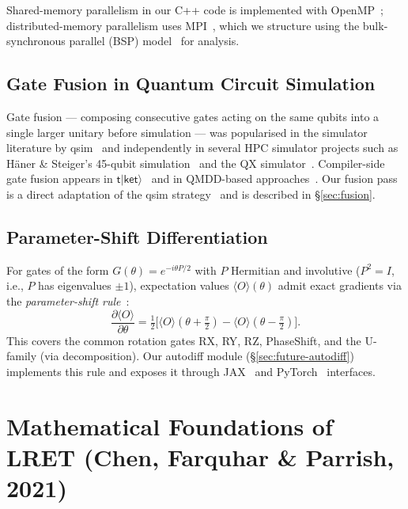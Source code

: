 \documentclass[11pt,a4paper]{article}
\begin{document}
Shared-memory parallelism in our C++ code is implemented with
OpenMP~\cite{dagummenon1998}; distributed-memory parallelism uses
MPI~\cite{gropp1999mpi}, which we structure using the bulk-synchronous parallel (BSP)
model~\cite{valiant1990bsp} for analysis.

\subsection{Gate Fusion in Quantum Circuit Simulation}
\label{sec:bg-fusion}

Gate fusion --- composing consecutive gates acting on the same qubits into a single
larger unitary before simulation --- was popularised in the simulator literature by
qsim~\cite{qsim} and independently in several HPC simulator projects such as
H\"aner \& Steiger's 45-qubit simulation~\cite{hanersteiger2017} and the QX
simulator~\cite{khammassi2017qx}. Compiler-side gate fusion appears in
$\mathsf{t\vert ket\rangle}$~\cite{sivarajah2020tket} and in QMDD-based
approaches~\cite{zulehner2018qmdd}. Our fusion pass is a direct adaptation of the
qsim strategy~\cite{qsim} and is described in \S\ref{sec:fusion}.

\subsection{Parameter-Shift Differentiation}
\label{sec:bg-psr}

For gates of the form $G(\theta) = e^{-i\theta P/2}$ with $P$ Hermitian and involutive
($P^2 = I$, i.e., $P$ has eigenvalues $\pm 1$), expectation values
$\langle O\rangle(\theta)$ admit exact gradients via the \emph{parameter-shift
rule}~\cite{mitarai2018,schuld2019}:
\begin{equation}
  \frac{\partial \langle O \rangle}{\partial \theta}
  = \tfrac{1}{2}\bigl[
      \langle O \rangle(\theta + \tfrac{\pi}{2})
      - \langle O \rangle(\theta - \tfrac{\pi}{2})
    \bigr].
\end{equation}
This covers the common rotation gates RX, RY, RZ, PhaseShift, and the U-family
(via decomposition). Our autodiff module (\S\ref{sec:future-autodiff}) implements this
rule and exposes it through JAX~\cite{jax} and PyTorch~\cite{paszke2019pytorch}
interfaces.

\section{Mathematical Foundations of LRET (Chen, Farquhar \& Parrish, 2021)}
\label{sec:math}
\end{document}
